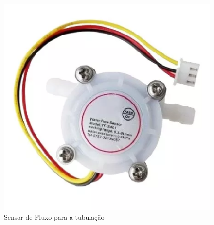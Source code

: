 \begin{figure}[!htb]                   
	\centering                          
	\includegraphics[scale=0.5]{figuras/Figura6.eps}
	\caption{Sensor de Fluxo para a tubulação}               
\end{figure}
